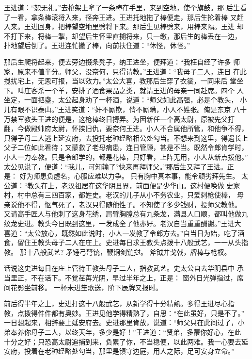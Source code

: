 王进道：“恕无礼。”去枪架上拿了一条棒在手里，来到空地，使个旗鼓。那
后生看了一看，拿条棒滚将入来，径奔王进。王进托地拖了棒便走，那后生抡着棒
又赶入来。王进回身，把棒望空地里劈将下来。那后生见棒劈来，用棒来隔。王进
却不打下来，将棒一掣，却望后生怀里直搠将来，只一缴，那后生的棒丢在一边，
扑地望后倒了。王进连忙撇了棒，向前扶住道：“休怪，休怪。”

那后生爬将起来，便去旁边掇条凳子，纳王进坐，便拜道：“我枉自经了许多
师家，原来不值半分。师父，没奈何，只得请教。”王进道：“我母子二人，连日
在此搅扰宅上，无恩可报，当以效力。”太公大喜，教那后生穿了衣裳，一同来后
堂坐下。叫庄客杀一个羊，安排了酒食果品之类，就请王进的母亲一同赴席。四个
人坐定，一面把盏，太公起身劝了一杯酒，说道：“师父如此高强，必是个教头，
小儿有眼不识泰山。”王进笑道：“奸不厮欺，俏不厮瞒，小人不姓张。俺是东京
八十万禁军教头王进的便是，这枪棒终日搏弄。为因新任一个高太尉，原被先父打
翻，今做殿帅府太尉，怀挟旧仇，要奈何王进。小人不合属他所管，和他争不得，
只得子母二人逃上延安府，去投托老种经略相公处勾当。不想来到这里，得遇长上
父子二位如此看待；又蒙救了老母病患，连日管顾，甚是不当。既然令郎肯学时，
小人一力奉教。只是令郎学的，都是花棒，只好看，上阵无用，小人从新点拨他。”
太公见说了，便道：“我儿，可知输了?快来再拜师父。”那后生又拜了王进。正
是：
好为师患负虚名，心服应难以力争。
只有胸中真本事，能令顽劣拜先生。
太公道：“教头在上，老汉祖居在这华阴县界，前面便是少华山。这村便唤做
史家村，村中总有三四百家，都姓史。老汉的儿子从小不务农业，只爱刺枪使棒，
母亲说他不得，怄气死了，老汉只得随他性子。不知使了多少钱财，投师父教他。
又请高手匠人与他刺了这身花绣，肩臂胸膛总有九条龙，满县人口顺，都叫他做九
纹龙史进。教头今日既到这里，一发成全了他亦好。老汉自当重重酬谢。”王进大
喜道：“太公放心，既然如此说时，小人一发教了令郎方去。”自当日为始，吃了酒
食，留住王教头母子二人在庄上。史进每日求王教头点拨十八般武艺，一一从头指
教。
那十八般武艺?
矛锤弓弩铳，鞭锏剑链挝。
斧钺并戈戟，牌棒与枪杈。

话说这史进每日在庄上管待王教头母子二人，指教武艺。史太公自去华阴县中
承当里正，不在话下。不觉荏苒光阴，早过半年之上，正是：
窗外日光弹指过，席间花影坐前移。
一杯未进笙歌送，阶下辰牌又报时。

前后得半年之上，史进打这十八般武艺，从新学得十分精熟。多得王进尽心指
教，点拨得件件都有奥妙。王进见他学得精熟了，自思：“在此虽好，只是不了。”
一日想起来，相辞要上延安府去。史进那里肯放，说道：“师父只在此间过了，小
弟奉养你母子二人，以终天年，多少是好！”王进道：“贤弟，多蒙你好心，在此
十分之好；只恐高太尉追捕到来，负累了你，不当稳便，以此两难。我一心要去延
安府，投着在老种经略处勾当，那里是镇守边庭，用人之际，足可安身立命。”

